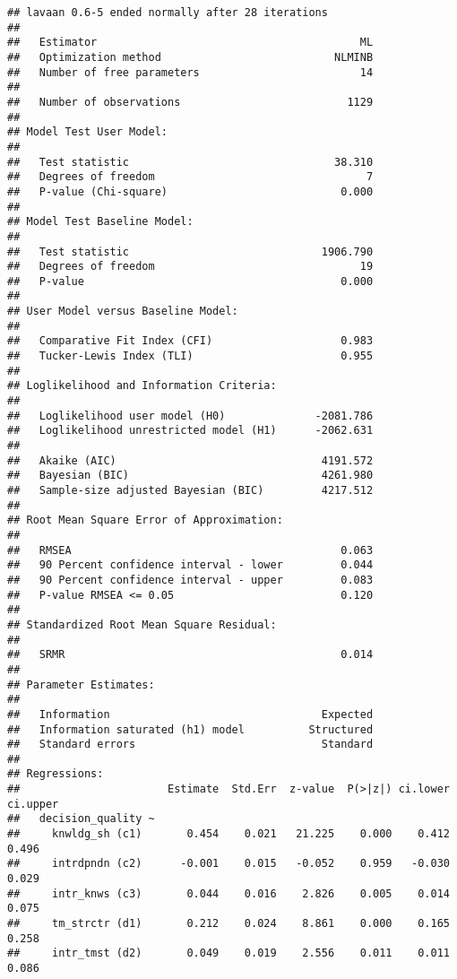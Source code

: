 \documentclass[]{article}
\begin{document}
\begin{verbatim}
## lavaan 0.6-5 ended normally after 28 iterations
## 
##   Estimator                                         ML
##   Optimization method                           NLMINB
##   Number of free parameters                         14
##                                                       
##   Number of observations                          1129
##                                                       
## Model Test User Model:
##                                                       
##   Test statistic                                38.310
##   Degrees of freedom                                 7
##   P-value (Chi-square)                           0.000
## 
## Model Test Baseline Model:
## 
##   Test statistic                              1906.790
##   Degrees of freedom                                19
##   P-value                                        0.000
## 
## User Model versus Baseline Model:
## 
##   Comparative Fit Index (CFI)                    0.983
##   Tucker-Lewis Index (TLI)                       0.955
## 
## Loglikelihood and Information Criteria:
## 
##   Loglikelihood user model (H0)              -2081.786
##   Loglikelihood unrestricted model (H1)      -2062.631
##                                                       
##   Akaike (AIC)                                4191.572
##   Bayesian (BIC)                              4261.980
##   Sample-size adjusted Bayesian (BIC)         4217.512
## 
## Root Mean Square Error of Approximation:
## 
##   RMSEA                                          0.063
##   90 Percent confidence interval - lower         0.044
##   90 Percent confidence interval - upper         0.083
##   P-value RMSEA <= 0.05                          0.120
## 
## Standardized Root Mean Square Residual:
## 
##   SRMR                                           0.014
## 
## Parameter Estimates:
## 
##   Information                                 Expected
##   Information saturated (h1) model          Structured
##   Standard errors                             Standard
## 
## Regressions:
##                       Estimate  Std.Err  z-value  P(>|z|) ci.lower ci.upper
##   decision_quality ~                                                       
##     knwldg_sh (c1)       0.454    0.021   21.225    0.000    0.412    0.496
##     intrdpndn (c2)      -0.001    0.015   -0.052    0.959   -0.030    0.029
##     intr_knws (c3)       0.044    0.016    2.826    0.005    0.014    0.075
##     tm_strctr (d1)       0.212    0.024    8.861    0.000    0.165    0.258
##     intr_tmst (d2)       0.049    0.019    2.556    0.011    0.011    0.086

\end{verbatim}
\end{document}
